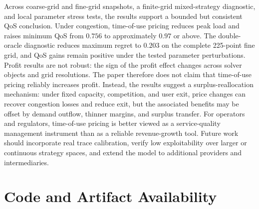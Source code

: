 \documentclass[11pt,a4paper]{article}
\begin{document}
Across coarse-grid and fine-grid snapshots, a finite-grid mixed-strategy diagnostic, and local parameter stress tests, the results support a bounded but consistent QoS conclusion. Under congestion, time-of-use pricing reduces peak load and raises minimum QoS from $0.756$ to approximately $0.97$ or above. The double-oracle diagnostic reduces maximum regret to $0.203$ on the complete 225-point fine grid, and QoS gains remain positive under the tested parameter perturbations. Profit results are not robust: the sign of the profit effect changes across solver objects and grid resolutions. The paper therefore does not claim that time-of-use pricing reliably increases profit. Instead, the results suggest a surplus-reallocation mechanism: under fixed capacity, competition, and user exit, price changes can recover congestion losses and reduce exit, but the associated benefits may be offset by demand outflow, thinner margins, and surplus transfer. For operators and regulators, time-of-use pricing is better viewed as a service-quality management instrument than as a reliable revenue-growth tool. Future work should incorporate real trace calibration, verify low exploitability over larger or continuous strategy spaces, and extend the model to additional providers and intermediaries.

\section*{Code and Artifact Availability}
\end{document}
